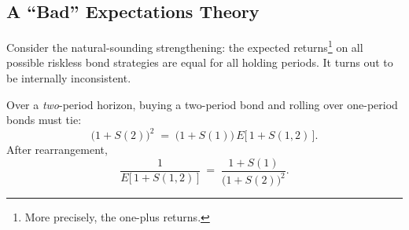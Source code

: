\subsection{A ``Bad'' Expectations Theory}


Consider the natural-sounding strengthening: the expected returns\footnote{More precisely, the one-plus returns.} on all possible riskless bond strategies are equal for all holding periods.
It turns out to be internally inconsistent.

Over a \emph{two}-period horizon, buying a two-period bond and rolling over one-period bonds must tie:
\begin{equation}
	\bigl(1+S(2)\bigr)^{2} \;=\; \bigl(1+S(1)\bigr)\,E\bigl[\,1+S(1,2)\,\bigr] . \label{eq:bad-two}
\end{equation}
After rearrangement,
\begin{equation}
	\frac{1}{E\bigl[\,1+S(1,2)\,\bigr]} \;=\; \frac{1+S(1)}{\bigl(1+S(2)\bigr)^{2}} . \label{eq:bad-two-rearranged}
\end{equation}

